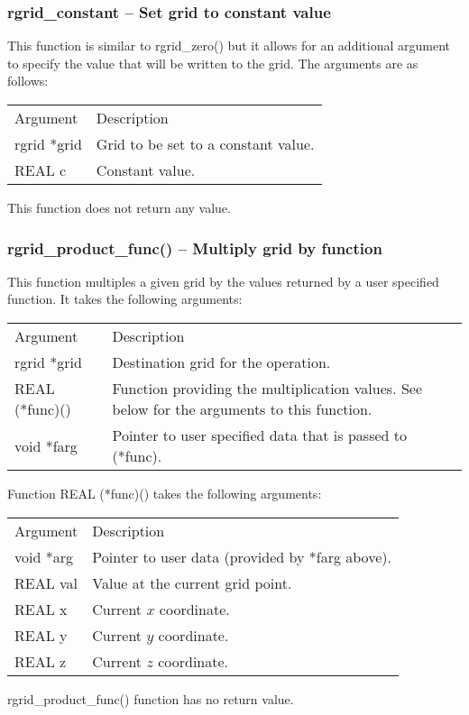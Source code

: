 \documentclass[12pt,letterpaper]{article}
\begin{document}
\subsubsection{rgrid\_constant -- Set grid to constant value}

This function is similar to rgrid\_zero() but it allows for an additional argument to specify the value that will be written to the grid. The arguments are as follows:
\begin{longtable}{p{} p{}}
Argument & Description\\
\cline{1-2}
rgrid *grid & Grid to be set to a constant value.\\
REAL c & Constant value.
\end{longtable}
\noindent
This function does not return any value.

\subsubsection{rgrid\_product\_func() -- Multiply grid by function}

This function multiples a given grid by the values returned by a user specified function. It takes the following arguments:
\begin{longtable}{p{} p{}}
Argument & Description\\
\cline{1-2}
rgrid *grid & Destination grid for the operation.\\
REAL (*func)() & Function providing the multiplication values. See below for the arguments to this function.\\
void *farg & Pointer to user specified data that is passed to (*func).\\   
\end{longtable}
\noindent
Function REAL (*func)() takes the following arguments:
\begin{longtable}{p{} p{}}
Argument & Description\\
\cline{1-2}
void *arg & Pointer to user data (provided by *farg above).\\
REAL val & Value at the current grid point.\\
REAL x & Current $x$ coordinate.\\
REAL y & Current $y$ coordinate.\\
REAL z & Current $z$ coordinate.\\
\end{longtable}
\noindent
rgrid\_product\_func() function has no return value.
\end{document}

